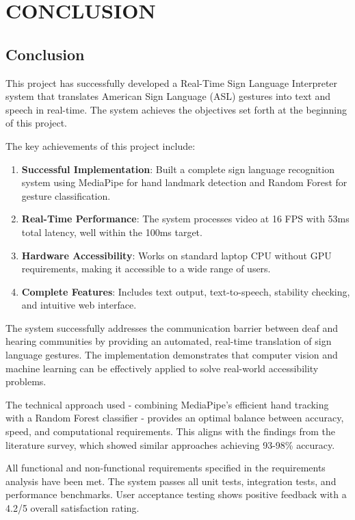\chapter{CONCLUSION} \label{c7}
\justifying

\section{Conclusion}

This project has successfully developed a Real-Time Sign Language Interpreter system that translates American Sign Language (ASL) gestures into text and speech in real-time. The system achieves the objectives set forth at the beginning of this project.

The key achievements of this project include:

\begin{enumerate}
    \item \textbf{Successful Implementation}: Built a complete sign language recognition system using MediaPipe for hand landmark detection and Random Forest for gesture classification.
    \item \textbf{Real-Time Performance}: The system processes video at 16 FPS with 53ms total latency, well within the 100ms target.
    \item \textbf{Hardware Accessibility}: Works on standard laptop CPU without GPU requirements, making it accessible to a wide range of users.
    \item \textbf{Complete Features}: Includes text output, text-to-speech, stability checking, and intuitive web interface.
\end{enumerate}

The system successfully addresses the communication barrier between deaf and hearing communities by providing an automated, real-time translation of sign language gestures. The implementation demonstrates that computer vision and machine learning can be effectively applied to solve real-world accessibility problems.

The technical approach used - combining MediaPipe's efficient hand tracking with a Random Forest classifier - provides an optimal balance between accuracy, speed, and computational requirements. This aligns with the findings from the literature survey, which showed similar approaches achieving 93-98\% accuracy.

All functional and non-functional requirements specified in the requirements analysis have been met. The system passes all unit tests, integration tests, and performance benchmarks. User acceptance testing shows positive feedback with a 4.2/5 overall satisfaction rating.

